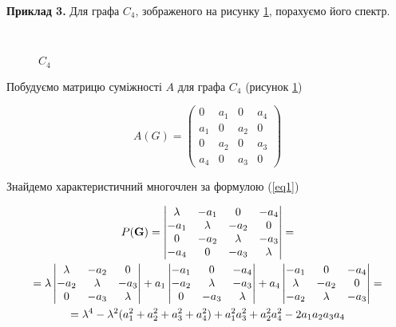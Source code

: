 
\textbf{Приклад 3.} Для графа $C_4$, зображеного на рисунку \ref{ex3:image}, порахуємо його спектр.\\
\begin{figure}[H]
    \centering
    \\
    \caption{$C_4$}
    \label{ex3:image}
\end{figure}

Побудуємо матрицю суміжності $A$ для графа $C_4$ (рисунок \ref{ex3:image})

\begin{equation*}
A(G) =
\begin{pmatrix}
0 & a_1 & 0 & a_4\\
a_1 & 0 & a_2 & 0\\
0 & a_2 & 0 & a_3\\
a_4 & 0 & a_3 & 0
\end{pmatrix}
\end{equation*}

Знайдемо характеристичний многочлен за формулою (\ref{eq1})

\begin{multline*}
    P({\bf G})= 
\begin{vmatrix}
    \lambda & -a_1 & 0 & -a_4\\
    -a_1 & \lambda & -a_2 & 0\\
    0 & -a_2 & \lambda & -a_3\\
    -a_4 & 0 & -a_3 & \lambda
\end{vmatrix}
= \\
=\lambda
\begin{vmatrix}
    \lambda & -a_2 & 0\\
    -a_2 & \lambda & -a_3\\
    0 & -a_3 & \lambda
\end{vmatrix}
+ a_1
\begin{vmatrix}
    -a_1 & 0 & -a_4\\
    -a_2 & \lambda & -a_3\\
    0 & -a_3 & \lambda
\end{vmatrix}
+ a_4
\begin{vmatrix}
    -a_1 & 0 & -a_4\\
    \lambda & -a_2 & 0\\
    -a_2 & \lambda & -a_3
\end{vmatrix}
= \\
= \lambda^4-\lambda^2(a_1^2+a_2^2+a_3^2+a_4^2)+a_1^2a_3^2+a_2^2a_4^2-2a_1a_2a_3a_4 
\end{multline*}

